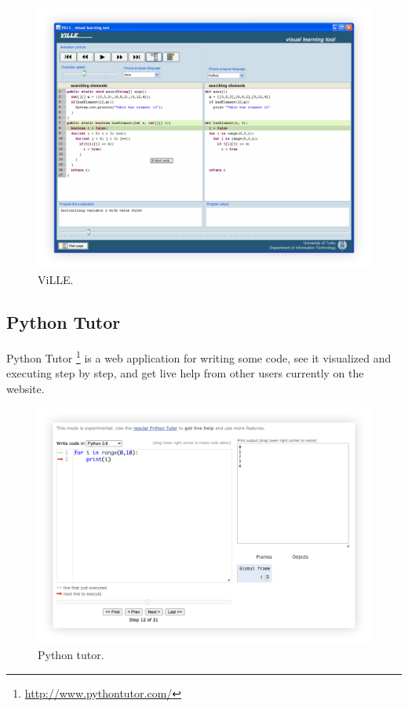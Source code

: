 \documentclass[]{usiinfbachelorproject}
\begin{document}
\begin{figure}[h]
\centering
\includegraphics[width=\textwidth]{figures/ville.png}
\caption {ViLLE.}
\end{figure}

\subsection{Python Tutor}

Python Tutor \footnote{\url{http://www.pythontutor.com/}} is a web application for writing some code, see it visualized and executing step by step, and get live help from other users currently on the website.

\begin{figure}[h]
\centering
\includegraphics[width=\textwidth]{figures/python_tutor}
\caption {Python tutor.}
\end{figure}
\end{document}
